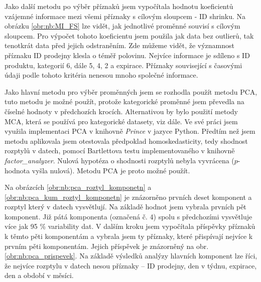 Jako další metodu po výběr příznaků jsem vypočítala hodnotu koeficientů vzájemné informace mezi všemi příznaky s cílovým sloupcem - ID shrinku. Na obrázku \ref*{obr:nb:MI_FS} lze vidět, jak jednotlivé proměnné souvisí s cílovým sloupcem. Pro výpočet tohoto koeficientu jsem použila jak data bez outlierů, tak tenotkrát data před jejich odstraněním. Zde můžeme vidět, že významnost příznaku ID prodejny klesla o téměř polovinu. Nejvíce informace je sdíleno s ID produktu, kategorií 6, dále 5, 4, 2 a expirace. Příznaky související s časovými údaji podle tohoto kritéria nenesou mnoho společné informace.

Jako hlavní metodu pro výběr proměnných jsem se rozhodla použít metodu PCA, tuto metodu je možné použít, protože kategorické proměnné jsem převedla na číselné hodnoty v předchozích krocích. Alternativou by bylo použití metody MCA, která se používá pro kategorické datasety, viz dále.
Ve své práci jsem využila implementaci PCA v knihovně \emph{Prince} v jazyce Python. 
Předtím než jsem metodu aplikovala jsem otestovala předpoklad homoskedasticity, tedy shodnost rozptylů v datech, pomocí Bartlettova testu implementovaného v knihovně \emph{factor\_analyzer}. Nulová hypotéza o shodnosti rozptylů nebyla vyvrácena ($p$-hodnota vyšla nulová). Metodu PCA je proto možné použít.

Na obrázcích \ref*{obr:nb:pca_roztyl_komponetn} a \ref*{obr:nb:pca_kum_roztyl_komponetn} je znázorněno prvních deset komponent a rozptyl který v datech vysvětlují. Na základě hodnot jsem vybrala prvních pět komponent. Již pátá komponenta (označená č. 4) spolu s předchozími vysvětluje více jak 95 \% variability dat. V dalším kroku jsem vypočítala příspěvky příznaků k těmto pěti komponentám a vybrala jsem ty příznaky, které přispívají nejvíce k prvním pěti komponentám. Jejich příspěvek je znázorněný na obr. \ref*{obr:nb:pca_prispevek}. Na základě výsledků analýzy hlavních komponent lze říci, že nejvíce rozptylu v datech nesou příznaky -- ID prodejny, den v týdnu, expirace, den a období v měsíci.

